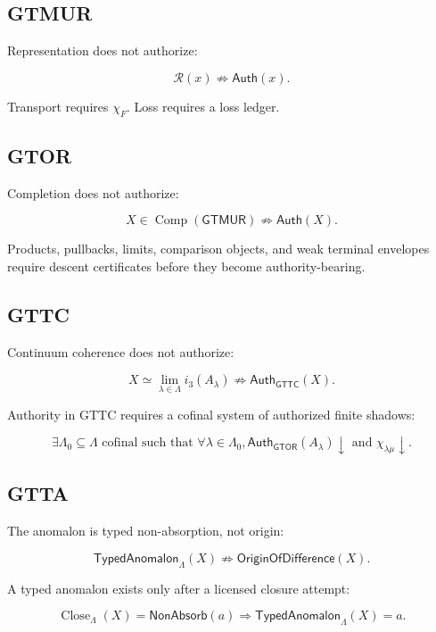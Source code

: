 \documentclass[11pt]{article}
\begin{document}
\subsection{GTMUR}

Representation does not authorize:

\[
\boxed{
\mathcal R(x)\not\Rightarrow\mathsf{Auth}(x).
}
\]

Transport requires \(\chi_F\). Loss requires a loss ledger.

\subsection{GTOR}

Completion does not authorize:

\[
\boxed{
X\in\operatorname{Comp}(\mathsf{GTMUR})
\not\Rightarrow
\mathsf{Auth}(X).
}
\]

Products, pullbacks, limits, comparison objects, and weak terminal envelopes require descent certificates before they become authority-bearing.

\subsection{GTTC}

Continuum coherence does not authorize:

\[
\boxed{
X\simeq\lim_{\lambda\in\Lambda}i_3(A_\lambda)
\not\Rightarrow
\mathsf{Auth}_{\mathsf{GTTC}}(X).
}
\]

Authority in GTTC requires a cofinal system of authorized finite shadows:

\[
\boxed{
\exists\Lambda_0\subseteq\Lambda\text{ cofinal such that }
\forall\lambda\in\Lambda_0,
\mathsf{Auth}_{\mathsf{GTOR}}(A_\lambda)\downarrow
\text{ and }
\chi_{\lambda\mu}\downarrow.
}
\]

\subsection{GTTA}

The anomalon is typed non-absorption, not origin:

\[
\boxed{
\mathsf{TypedAnomalon}_\Lambda(X)
\not\Rightarrow
\mathsf{OriginOfDifference}(X).
}
\]

A typed anomalon exists only after a licensed closure attempt:

\[
\boxed{
\operatorname{Close}_\Lambda(X)=\mathsf{NonAbsorb}(a)
\Rightarrow
\mathsf{TypedAnomalon}_\Lambda(X)=a.
}
\]
\end{document}
